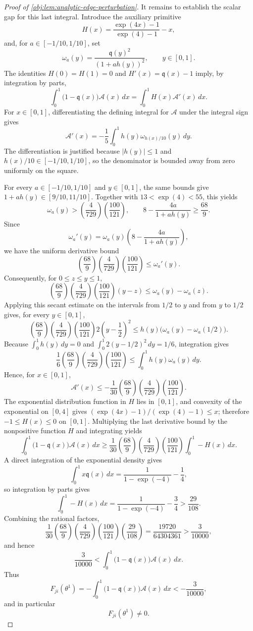 \documentclass[11pt]{article}
\begin{document}
\begin{proof}[Proof of \cref{obj:lem:analytic-edge-perturbation}]
It remains to establish the scalar gap for this last integral.  Introduce the auxiliary primitive
\[
H(x)=\frac{\exp(4x)-1}{\exp(4)-1}-x,
\]
and, for \(a\in[-1/10,1/10]\), set
\[
\omega_a(y)=\frac{\mathfrak q(y)^2}{(1+a h(y))^2},
\qquad y\in[0,1].
\]
The identities \(H(0)=H(1)=0\) and \(H'(x)=\mathfrak q(x)-1\) imply, by integration by parts,
\[
\int_0^1 \bigl(1-\mathfrak q(x)\bigr)\mathcal A(x)\,dx
=\int_0^1 H(x)\mathcal A'(x)\,dx .
\]
For \(x\in[0,1]\), differentiating the defining integral for \(\mathcal A\) under the integral sign gives
\[
\mathcal A'(x)
=-\frac15\int_0^1 h(y)\omega_{h(x)/10}(y)\,dy .
\]
The differentiation is justified because \(|h(y)|\le1\) and \(h(x)/10\in[-1/10,1/10]\), so the denominator is bounded away from zero uniformly on the square.

For every \(a\in[-1/10,1/10]\) and \(y\in[0,1]\), the same bounds give \(1+a h(y)\in[9/10,11/10]\).  Together with \(13<\exp(4)<55\), this yields
\[
\omega_a(y)>\left(\frac{4}{729}\right)\left(\frac{100}{121}\right),
\qquad
8-\frac{4a}{1+a h(y)}\ge \frac{68}{9}.
\]
Since
\[
\omega_a'(y)
=\omega_a(y)\left(8-\frac{4a}{1+a h(y)}\right),
\]
we have the uniform derivative bound
\[
\left(\frac{68}{9}\right)\left(\frac{4}{729}\right)\left(\frac{100}{121}\right)
\le \omega_a'(y).
\]
Consequently, for \(0\le z\le y\le1\),
\[
\left(\frac{68}{9}\right)\left(\frac{4}{729}\right)\left(\frac{100}{121}\right)(y-z)
\le \omega_a(y)-\omega_a(z).
\]
Applying this secant estimate on the intervals from \(1/2\) to \(y\) and from \(y\) to \(1/2\) gives, for every \(y\in[0,1]\),
\[
\left(\frac{68}{9}\right)\left(\frac{4}{729}\right)\left(\frac{100}{121}\right)2\left(y-\frac12\right)^2
\le h(y)\bigl(\omega_a(y)-\omega_a(1/2)\bigr).
\]
Because \(\int_0^1 h(y)\,dy=0\) and \(\int_0^1 2(y-1/2)^2\,dy=1/6\), integration gives
\[
\frac16\left(\frac{68}{9}\right)\left(\frac{4}{729}\right)\left(\frac{100}{121}\right)
\le
\int_0^1 h(y)\omega_a(y)\,dy .
\]
Hence, for \(x\in[0,1]\),
\[
\mathcal A'(x)
\le
-\frac1{30}\left(\frac{68}{9}\right)\left(\frac{4}{729}\right)\left(\frac{100}{121}\right).
\]
The exponential distribution function in \(H\) lies in \([0,1]\), and convexity of the exponential on \([0,4]\) gives \((\exp(4x)-1)/(\exp(4)-1)\le x\); therefore \(-1\le H(x)\le0\) on \([0,1]\).  Multiplying the last derivative bound by the nonpositive function \(H\) and integrating yields
\[
\int_0^1 \bigl(1-\mathfrak q(x)\bigr)\mathcal A(x)\,dx
\ge
\frac1{30}\left(\frac{68}{9}\right)\left(\frac{4}{729}\right)\left(\frac{100}{121}\right)
\int_0^1 -H(x)\,dx .
\]
A direct integration of the exponential density gives
\[
\int_0^1 x\mathfrak q(x)\,dx
=\frac{1}{1-\exp(-4)}-\frac14,
\]
so integration by parts gives
\[
\int_0^1 -H(x)\,dx
=\frac{1}{1-\exp(-4)}-\frac34
>\frac{29}{108}.
\]
Combining the rational factors,
\[
\frac1{30}\left(\frac{68}{9}\right)\left(\frac{4}{729}\right)\left(\frac{100}{121}\right)\left(\frac{29}{108}\right)
=\frac{19720}{64304361}
>\frac{3}{10000},
\]
and hence
\[
\frac{3}{10000}
<
\int_0^1 \bigl(1-\mathfrak q(x)\bigr)\mathcal A(x)\,dx .
\]
Thus
\[
F_{ji}(\theta^1)
=-\int_0^1 \bigl(1-\mathfrak q(x)\bigr)\mathcal A(x)\,dx
< -\frac{3}{10000},
\]
and in particular
\[
F_{ji}(\theta^1)\ne0 .
\] %


\end{proof}
\end{document}
